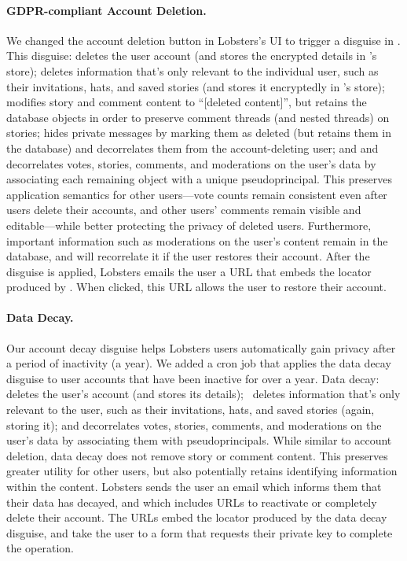 \paragraph{GDPR-compliant Account Deletion.}
%
We changed the account deletion button in Lobsters's UI to trigger a disguise in \sys.
%
This disguise:
\one{} deletes the user account (and stores the encrypted details in \sys's store);
\two{} deletes information that's only relevant to the individual user, such as their
invitations, hats, and saved stories (and stores it encryptedly in \sys's store);
\three{} modifies story and comment content to ``[deleted content]'', but retains the
database objects in order to preserve comment threads (and nested threads) on stories;
\four{} hides private messages by marking them as deleted (but retains them in the
database) and decorrelates them from the account-deleting user; and
\five{} and decorrelates votes, stories, comments, and moderations on the user's
data by associating each remaining object with a unique pseudoprincipal.
%
This preserves application semantics for other users---\eg vote counts remain consistent
even after users delete their accounts, and other users' comments remain visible and
editable---while better protecting the privacy of deleted users.
%
Furthermore, important information such as moderations on the user's content remain in
the database, and \sys will recorrelate it if the user restores their account.
%
After the disguise is applied, Lobsters emails the user a URL that embeds the locator
produced by \sys.
%
When clicked, this URL allows the user to restore their account.
%

\paragraph{Data Decay.}
%
Our account decay disguise helps Lobsters users automatically gain privacy
after a period of inactivity (\eg a year).
%
We added a cron job that applies the data decay disguise to user accounts that have
been inactive for over a year.
%
Data decay:
\one{} deletes the user's account (and stores its details);
\two{} deletes information that's only relevant to the user, such as their invitations, hats,
and saved stories (again, storing it);
\three{} and decorrelates votes, stories, comments, and moderations on the
user's data by associating them with pseudoprincipals.
%
While similar to account deletion, data decay does not remove story or comment
content.
%
This preserves greater utility for other users, but also potentially retains
identifying information within the content.
%
Lobsters sends the user an email which informs them that their data has decayed,
and which includes URLs to reactivate or completely delete their account.
%
The URLs embed the locator produced by the data decay disguise, and take the user
to a form that requests their private key to complete the operation.
%

